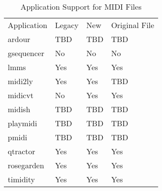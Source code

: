    \begin{table}
      \caption{Application Support for MIDI Files}
      \label{table:midi_file_support_table}
      \begin{tabular}{l l l l}
         Application  & Legacy    & New       & Original File \\
         ardour       & TBD       & TBD       & TBD \\
         gsequencer   & No        & No        & No \\
         lmms         & Yes       & Yes       & Yes \\
         midi2ly      & Yes       & Yes       & TBD \\
         midicvt      & No        & Yes       & Yes \\
         midish       & TBD       & TBD       & TBD \\
         playmidi     & TBD       & TBD       & TBD \\
         pmidi        & TBD       & TBD       & TBD \\
         qtractor     & Yes       & Yes       & Yes \\
         rosegarden   & Yes       & Yes       & Yes \\
         timidity     & Yes       & Yes       & Yes \\
      \end{tabular}
   \end{table}

